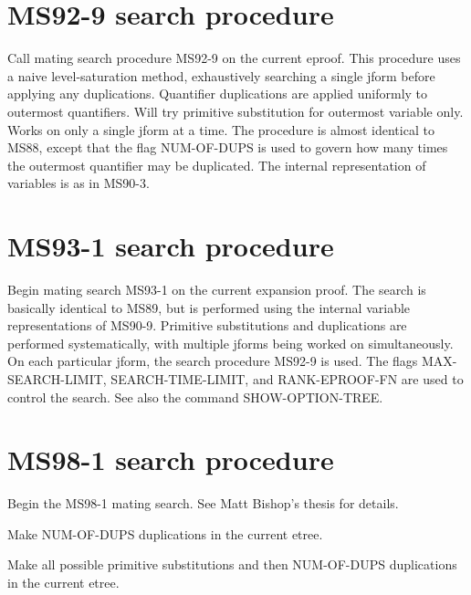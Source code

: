 \section{MS92-9 search procedure}

\begin{description} 
\item[MS92-9]  
Call mating search procedure MS92-9 on the current eproof.  This
procedure uses a naive level-saturation method, exhaustively searching
a single jform before applying any duplications. Quantifier duplications
are applied uniformly to outermost quantifiers. Will try primitive
substitution for outermost variable only.  Works on only a single
jform at a time.
The procedure is almost identical to MS88, except that the flag
NUM-OF-DUPS is used to govern how many times the outermost quantifier
may be duplicated. The internal representation of variables is as in
MS90-3.
\item
\end{description}

\section{MS93-1 search procedure}

\begin{description} 
\item[MS93-1]  
Begin mating search MS93-1 on the current expansion proof.
The search is basically identical to MS89, but is performed using the 
internal variable representations of MS90-9.
Primitive substitutions and duplications are performed systematically,
with multiple jforms being worked on simultaneously.  On each
particular jform, the search procedure MS92-9 is used.  The flags
MAX-SEARCH-LIMIT, SEARCH-TIME-LIMIT, and RANK-EPROOF-FN are used to
control the search. See also the command SHOW-OPTION-TREE.
\item
\end{description}

\section{MS98-1 search procedure}

\begin{description} 
\item[MS98-1]  
Begin the MS98-1 mating search. 
See Matt Bishop's thesis for details.

\item[MS98-DUP]  
Make NUM-OF-DUPS duplications in the current etree.

\item[MS98-PRIM]  
Make all possible primitive substitutions and 
then NUM-OF-DUPS duplications in the current etree.
\item
\end{description}


